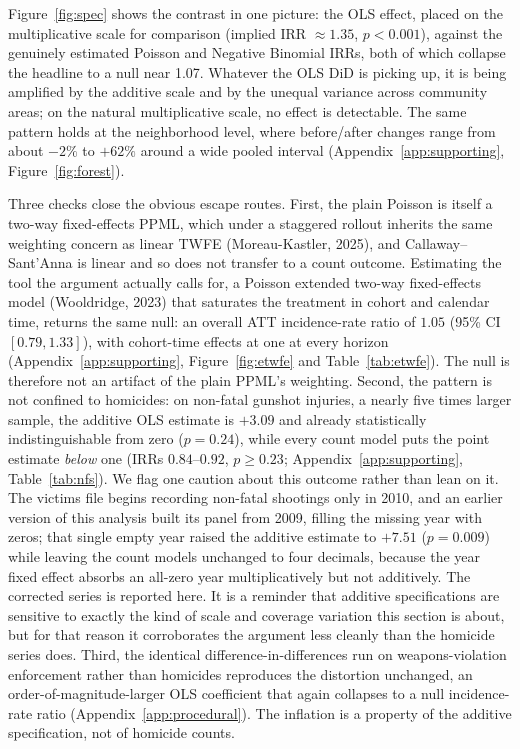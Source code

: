\documentclass[12pt]{article}
\begin{document}
Figure~\ref{fig:spec} shows the contrast in one picture: the OLS effect, placed on the
multiplicative scale for comparison (implied IRR $\approx 1.35$, $p < 0.001$), against the
genuinely estimated Poisson and Negative Binomial IRRs, both of which collapse the
headline to a null near 1.07. Whatever the OLS DiD is picking up, it is being amplified
by the additive scale and by the unequal variance across community areas; on the natural
multiplicative scale, no effect is detectable. The same pattern holds at the neighborhood
level, where before/after changes range from about $-2\%$ to $+62\%$ around a wide pooled
interval (Appendix~\ref{app:supporting}, Figure~\ref{fig:forest}).

Three checks close the obvious escape routes. First, the plain Poisson is itself a two-way
fixed-effects PPML, which under a staggered rollout inherits the same weighting concern as
linear TWFE (Moreau-Kastler, 2025), and Callaway--Sant'Anna is linear and so does not
transfer to a count outcome. Estimating the tool the argument actually calls for, a Poisson
extended two-way fixed-effects model (Wooldridge, 2023) that saturates the treatment in
cohort and calendar time, returns the same null: an overall ATT incidence-rate ratio of
$1.05$ (95\% CI $[0.79, 1.33]$), with cohort-time effects at one at every horizon
(Appendix~\ref{app:supporting}, Figure~\ref{fig:etwfe} and Table~\ref{tab:etwfe}). The null is therefore not an artifact
of the plain PPML's weighting. Second, the pattern is not confined to homicides: on
non-fatal gunshot injuries, a nearly five times larger sample, the additive OLS estimate is
$+3.09$ and already statistically indistinguishable from zero ($p = 0.24$), while every
count model puts the point estimate \emph{below} one (IRRs $0.84$--$0.92$, $p \geq 0.23$;
Appendix~\ref{app:supporting}, Table~\ref{tab:nfs}). We flag one caution about this outcome
rather than lean on it. The victims file begins recording non-fatal shootings only in 2010,
and an earlier version of this analysis built its panel from 2009, filling the missing year
with zeros; that single empty year raised the additive estimate to $+7.51$ ($p = 0.009$)
while leaving the count models unchanged to four decimals, because the year fixed effect
absorbs an all-zero year multiplicatively but not additively. The corrected series is
reported here. It is a reminder that additive specifications are sensitive to exactly the
kind of scale and coverage variation this section is about, but for that reason it
corroborates the argument less cleanly than the homicide series does. Third, the identical
difference-in-differences run on weapons-violation enforcement rather than homicides
reproduces the distortion unchanged, an order-of-magnitude-larger OLS coefficient that again
collapses to a null incidence-rate ratio (Appendix~\ref{app:procedural}). The inflation is a
property of the additive specification, not of homicide counts.
\end{document}
